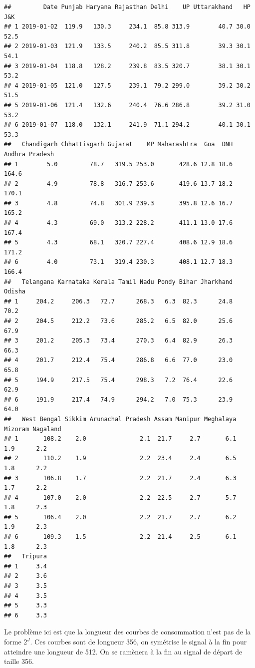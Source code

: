 \documentclass[
]{article}
\begin{document}
\begin{verbatim}
##         Date Punjab Haryana Rajasthan Delhi    UP Uttarakhand   HP  J&K
## 1 2019-01-02  119.9   130.3     234.1  85.8 313.9        40.7 30.0 52.5
## 2 2019-01-03  121.9   133.5     240.2  85.5 311.8        39.3 30.1 54.1
## 3 2019-01-04  118.8   128.2     239.8  83.5 320.7        38.1 30.1 53.2
## 4 2019-01-05  121.0   127.5     239.1  79.2 299.0        39.2 30.2 51.5
## 5 2019-01-06  121.4   132.6     240.4  76.6 286.8        39.2 31.0 53.2
## 6 2019-01-07  118.0   132.1     241.9  71.1 294.2        40.1 30.1 53.3
##   Chandigarh Chhattisgarh Gujarat    MP Maharashtra  Goa  DNH Andhra Pradesh
## 1        5.0         78.7   319.5 253.0       428.6 12.8 18.6          164.6
## 2        4.9         78.8   316.7 253.6       419.6 13.7 18.2          170.1
## 3        4.8         74.8   301.9 239.3       395.8 12.6 16.7          165.2
## 4        4.3         69.0   313.2 228.2       411.1 13.0 17.6          167.4
## 5        4.3         68.1   320.7 227.4       408.6 12.9 18.6          171.2
## 6        4.0         73.1   319.4 230.3       408.1 12.7 18.3          166.4
##   Telangana Karnataka Kerala Tamil Nadu Pondy Bihar Jharkhand Odisha
## 1     204.2     206.3   72.7      268.3   6.3  82.3      24.8   70.2
## 2     204.5     212.2   73.6      285.2   6.5  82.0      25.6   67.9
## 3     201.2     205.3   73.4      270.3   6.4  82.9      26.3   66.3
## 4     201.7     212.4   75.4      286.8   6.6  77.0      23.0   65.8
## 5     194.9     217.5   75.4      298.3   7.2  76.4      22.6   62.9
## 6     191.9     217.4   74.9      294.2   7.0  75.3      23.9   64.0
##   West Bengal Sikkim Arunachal Pradesh Assam Manipur Meghalaya Mizoram Nagaland
## 1       108.2    2.0               2.1  21.7     2.7       6.1     1.9      2.2
## 2       110.2    1.9               2.2  23.4     2.4       6.5     1.8      2.2
## 3       106.8    1.7               2.2  21.7     2.4       6.3     1.7      2.2
## 4       107.0    2.0               2.2  22.5     2.7       5.7     1.8      2.3
## 5       106.4    2.0               2.2  21.7     2.7       6.2     1.9      2.3
## 6       109.3    1.5               2.2  21.4     2.5       6.1     1.8      2.3
##   Tripura
## 1     3.4
## 2     3.6
## 3     3.5
## 4     3.5
## 5     3.3
## 6     3.3
\end{verbatim}

Le problème ici est que la longueur des courbes de consommation n'est
pas de la forme \(2^J\). Ces courbes sont de longueur 356, on symétrise
le signal à la fin pour atteindre une longueur de 512. On se ramènera à
la fin au signal de départ de taille 356.
\end{document}
